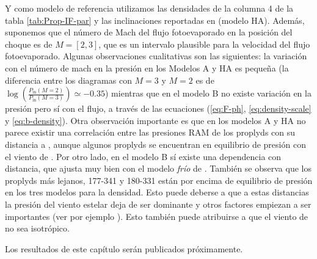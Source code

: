 Y como modelo de referencia utilizamos las densidades de la columna 4 de la tabla \ref{tab:Prop-IF-par} y las inclinaciones reportadas en \citet{HA:1998} (modelo HA). Además, suponemos que el número de Mach del flujo fotoevaporado en la posición del choque es de $M=[2, 3]$, que es un intervalo plausible para la velocidad del flujo fotoevaporado. Algunas observaciones cualitativas son las siguientes: la variación con el número de mach en la presión en los Modelos A y HA es pequeña (la diferencia entre los diagramas con $M=3$ y $M=2$ es de $\log\left(\frac{P_{\mathrm{in}}(M=2)}{P_{\mathrm{in}}(M=3)}\right)\simeq -0.35$) mientras que en el modelo B no existe variación en la presión pero sí con el flujo, a través de las ecuaciones (\ref{eq:F-ph}, \ref{eq:density-scale} y \ref{eq:b-density}). Otra observación importante es que en los modelos A y HA no parece existir una correlación entre las presiones RAM de los proplyds con su distancia a \thC{}, aunque algunos proplyds se encuentran en equilibrio de presión con el viento de \thC{}. Por otro lado, en el modelo B sí existe una dependencia con distancia, que ajusta muy bien con el modelo \textit{frío} de \citet{Gagne:2005}. También se observa que los proplyds más lejanos, 177-341 y 180-331 están por encima de equilibrio de presión en los tres modelos para la densidad. Esto puede deberse a que a estas distancias la presión del viento estelar deja de ser dominante y otros factores empiezan a ser importantes (ver por ejemplo \citet{GAH:2002}). Esto también puede atribuirse a que el viento de \thC{} no sea isotrópico.

Los resultados de este capítulo serán publicados próximamente.

